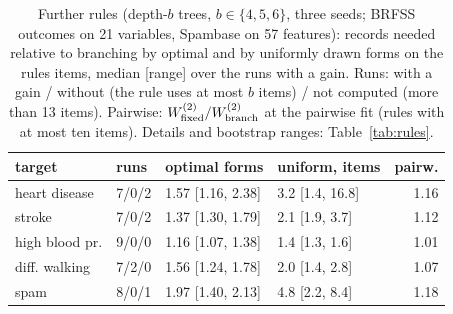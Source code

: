 \begin{table}[t]
\centering
\caption{Further rules (depth-$b$ trees, $b\in\{4,5,6\}$, three seeds; BRFSS outcomes on 21 variables, Spambase on 57 features): records needed relative to branching by optimal and by uniformly drawn forms on the rule\textquotesingle s items, median [range] over the runs with a gain. Runs: with a gain / without (the rule uses at most $b$ items) / not computed (more than 13 items). Pairwise: $W^{(2)}_{\rm fixed}/W^{(2)}_{\rm branch}$ at the pairwise fit (rules with at most ten items). Details and bootstrap ranges: Table~\ref{tab:rules}.}
\label{tab:rulesmain}
\footnotesize
\setlength{\tabcolsep}{2pt}
\begin{tabular}{llllr}
\toprule
target & runs & optimal forms & uniform, items & pairw. \\
\midrule
heart disease & 7/0/2 & 1.57 [1.16, 2.38] & 3.2 [1.4, 16.8] & 1.16 \\
stroke & 7/0/2 & 1.37 [1.30, 1.79] & 2.1 [1.9, 3.7] & 1.12 \\
high blood pr. & 9/0/0 & 1.16 [1.07, 1.38] & 1.4 [1.3, 1.6] & 1.01 \\
diff. walking & 7/2/0 & 1.56 [1.24, 1.78] & 2.0 [1.4, 2.8] & 1.07 \\
spam & 8/0/1 & 1.97 [1.40, 2.13] & 4.8 [2.2, 8.4] & 1.18 \\
\bottomrule
\end{tabular}
\end{table}
